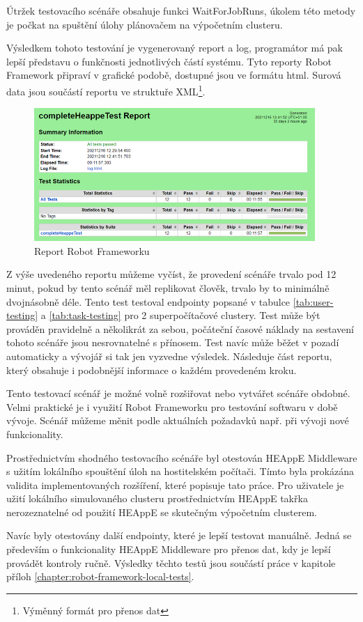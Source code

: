 Útržek testovacího scénáře obsahuje funkci WaitForJobRuns, úkolem této metody je počkat na spuštění úlohy plánovačem na výpočetním clusteru.




Výsledkem tohoto testování je vygenerovaný report a log, programátor má pak lepší představu o funkčnosti jednotlivých částí systému. Tyto reporty Robot Framework připraví v grafické podobě, dostupné jsou ve formátu html. Surová data jsou součástí reportu ve struktuře XML\footnote{Výměnný formát pro přenos dat}.








\begin{figure}[h]
	\centering
	\includegraphics[width=0.95\textwidth]{Figures/report-small.png}
	\caption{Report Robot Frameworku}
	\label{fig:report-robot-framework}
\end{figure}

Z výše uvedeného reportu můžeme vyčíst, že provedení scénáře trvalo pod 12 minut, pokud by tento scénář měl replikovat člověk, trvalo by to minimálně dvojnásobně déle. Tento test testoval endpointy popsané v tabulce \ref{tab:user-testing} a \ref{tab:task-testing} pro 2 superpočítačové clustery. Test může být prováděn pravidelně a několikrát za sebou, počáteční časové náklady na sestavení tohoto scénáře jsou nesrovnatelné s přínosem. Test navíc může běžet v pozadí automaticky a vývojář si tak jen vyzvedne výsledek. Následuje část reportu, který obsahuje i podobnější informace o každém provedeném kroku.


Tento testovací scénář je možné volně rozšiřovat nebo vytvářet scénáře obdobné. Velmi praktické je i využití Robot Frameworku pro testování softwaru v době vývoje. Scénář můžeme měnit podle aktuálních požadavků např. při vývoji nové funkcionality.

Prostřednictvím shodného testovacího scénáře byl otestován HEAppE Middleware s užitím lokálního spouštění úloh na hostitelském počítači. Tímto byla prokázána validita implementovaných rozšíření, které popisuje tato práce. Pro uživatele je užití lokálního simulovaného clusteru prostřednictvím HEAppE takřka nerozeznatelné od použití HEAppE se skutečným výpočetním clusterem.

Navíc byly otestovány další endpointy, které je lepší testovat manuálně. Jedná se především o funkcionality HEAppE Middleware pro přenos dat, kdy je lepší provádět kontroly ručně.
Výsledky těchto testů jsou součástí práce v kapitole příloh \ref{chapter:robot-framework-local-tests}.

